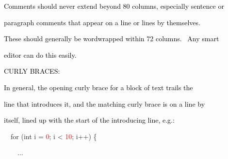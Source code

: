 \documentclass[a4paper]{article}
\newcommand\textstyleOOoComputerKeyWord[1]{\textrm{\textcolor[rgb]{0.0,0.0,0.5019608}{#1}}}
\newcommand\textstyleOOoComputerIdent[1]{\textrm{\textcolor[rgb]{0.0,0.5019608,0.0}{#1}}}
\newcommand\textstyleOOoComputerLiteral[1]{\textrm{\textcolor{red}{#1}}}
\begin{document}
\bigskip

{\color{black}
\textstyleOOoComputerKeyWord{\textcolor{black}{Comments should never extend beyond 80 columns, especially sentence or}}}

{\color{black}
\textstyleOOoComputerKeyWord{\textcolor{black}{paragraph comments that appear on a line or lines by themselves.}}}

{\color{black}
\textstyleOOoComputerKeyWord{\textcolor{black}{These should generally be wordwrapped within 72 columns. \ Any smart}}}

{\color{black}
\textstyleOOoComputerKeyWord{\textcolor{black}{editor can do this easily.}}}


\bigskip

{\color{black}
\textstyleOOoComputerKeyWord{\textcolor{black}{CURLY BRACES:}}}


\bigskip

{\color{black}
\textstyleOOoComputerKeyWord{\textcolor{black}{In general, the opening curly brace for a block of text trails the}}}

{\color{black}
\textstyleOOoComputerKeyWord{\textcolor{black}{line that introduces it, and the matching curly brace is on a line by}}}

{\color{black}
\textstyleOOoComputerKeyWord{\textcolor{black}{itself, lined up with the start of the introducing line, e.g.:}}}


\bigskip

{\color{black}
\textstyleOOoComputerKeyWord{\textcolor{black}{\ \ }}\textstyleOOoComputerKeyWord{for}\textstyleOOoComputerKeyWord{\textcolor{black}{
}}\textstyleOOoComputerKeyWord{(int}\textstyleOOoComputerKeyWord{\textcolor{black}{
}}\textstyleOOoComputerIdent{i}\textstyleOOoComputerKeyWord{\textcolor{black}{
}}\textstyleOOoComputerKeyWord{=}\textstyleOOoComputerKeyWord{\textcolor{black}{
}}\textstyleOOoComputerLiteral{0}\textstyleOOoComputerKeyWord{;}\textstyleOOoComputerKeyWord{\textcolor{black}{
}}\textstyleOOoComputerIdent{i}\textstyleOOoComputerKeyWord{\textcolor{black}{
}}\textstyleOOoComputerKeyWord{{\textless}}\textstyleOOoComputerKeyWord{\textcolor{black}{
}}\textstyleOOoComputerLiteral{10}\textstyleOOoComputerKeyWord{;}\textstyleOOoComputerKeyWord{\textcolor{black}{
}}\textstyleOOoComputerIdent{i}\textstyleOOoComputerKeyWord{++)}\textstyleOOoComputerKeyWord{\textcolor{black}{
}}\textstyleOOoComputerKeyWord{\{}}

{\color{black}
\textstyleOOoComputerKeyWord{\textcolor{black}{\ \ \ \ }}\textstyleOOoComputerKeyWord{...}}
\end{document}
